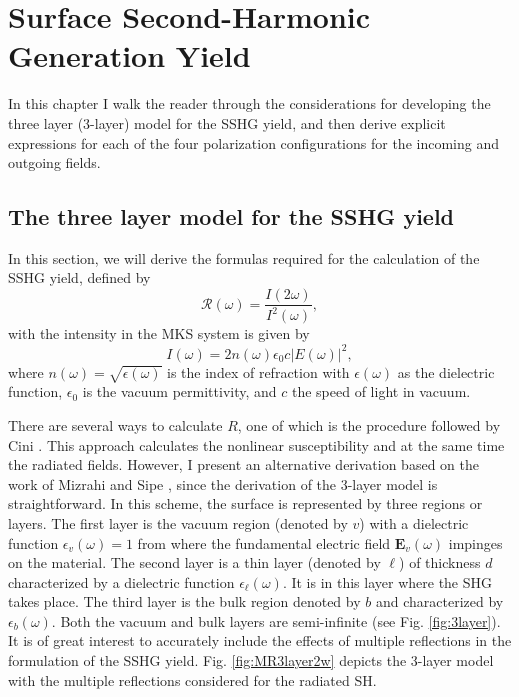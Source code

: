 \chapter{Surface Second-Harmonic Generation Yield}
\minitoc

In this chapter I walk the reader through the considerations for developing the
three layer (3-layer) model for the SSHG yield, and then derive explicit
expressions for each of the four polarization configurations for the incoming
and outgoing fields.



\section{The three layer model for the SSHG yield}

In this section, we will derive the formulas required for the calculation of the
SSHG yield, defined by
\begin{equation}\label{uno}
\mathcal{R}(\omega)=\frac{I(2\omega)}{I^2(\omega)},
\end{equation}
with the intensity in the MKS system is given by \cite{boyd, sutherland}
\begin{equation}\label{dos}
I(\omega)=2n(\omega)\epsilon_{0}c|E(\omega)|^2,
\end{equation}
where $n(\omega)=\sqrt{\epsilon(\omega)}$ is the index of refraction with
$\epsilon(\omega)$ as the dielectric function, $\epsilon_{0}$ is the vacuum
permittivity, and $c$ the speed of light in vacuum.

There are several ways to calculate $R$, one of which is the procedure followed
by Cini \cite{ciniPRB91}. This approach calculates the nonlinear susceptibility
and at the same time the radiated fields. However, I present an alternative
derivation based on the work of Mizrahi and Sipe \cite{mizrahiJOSA88}, since the
derivation of the 3-layer model is straightforward. In this scheme, the surface
is represented by three regions or layers. The first layer is the vacuum region
(denoted by $v$) with a dielectric function $\epsilon_v(\omega)=1$ from where
the fundamental electric field $\mathbf{E}_{v}(\omega)$ impinges on the
material. The second layer is a thin layer (denoted by $\ell$) of thickness $d$
characterized by a dielectric function $\epsilon_\ell(\omega)$. It is in this
layer where the SHG takes place. The third layer is the bulk region denoted by
$b$ and characterized by $\epsilon_b(\omega)$. Both the vacuum and bulk layers
are semi-infinite (see Fig. \ref{fig:3layer}). It is of great interest to
accurately include the effects of multiple reflections in the formulation of the
SSHG yield. Fig. \ref{fig:MR3layer2w} depicts the 3-layer model with the
multiple reflections considered for the radiated SH.


